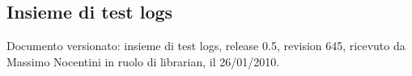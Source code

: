 \subsection{Insieme di test logs}
Documento versionato: insieme di test logs, release 0.5, revision 645, ricevuto
da Massimo Nocentini in ruolo di librarian, il 26/01/2010.